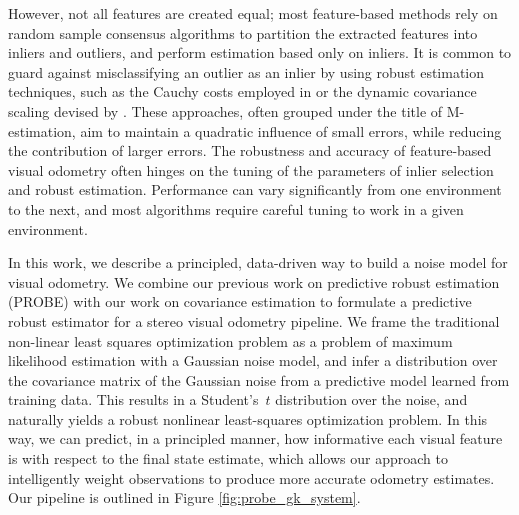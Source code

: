 However, not all features are created equal; most feature-based methods rely on
random sample consensus algorithms \citep{fischler1981random} to partition the extracted features
into inliers and outliers, and perform estimation based only on inliers. It is
common to guard against misclassifying an outlier as an inlier by using robust
estimation techniques, such as the Cauchy costs employed in
\citet{kerl2013robust} or the dynamic covariance scaling devised
by \citet{Burgard:ii}. These approaches, often grouped under the title of M-estimation, aim to maintain a quadratic influence
of small errors, while reducing the contribution of larger errors. The
robustness and accuracy of feature-based visual odometry often hinges on the
tuning of the parameters of inlier selection and robust estimation. Performance
can vary significantly from one environment to the next, and most algorithms require
careful tuning to work in a given environment. 

In this work, we describe a principled, data-driven way to build a noise model
for visual odometry. We combine our previous work \citep{peretroukhin2015PROBE}
on predictive robust estimation (PROBE) with our work on covariance estimation
\citep{VegaBrown:2013fv} to formulate a predictive robust estimator for a
stereo visual odometry pipeline. We frame the traditional non-linear least
squares optimization problem as a problem of maximum likelihood estimation with
a Gaussian noise model, and infer a distribution over the covariance matrix of
the Gaussian noise from a predictive model learned from training data. This
results in a Student's~$t$ distribution over the noise, and naturally yields a
robust nonlinear least-squares optimization problem.  In this way, we can predict,
in a principled manner, how informative each visual feature is with respect to the final state
estimate, which allows our approach to intelligently weight observations to
produce more accurate odometry estimates.  Our pipeline is outlined in
Figure \ref{fig:probe_gk_system}.

